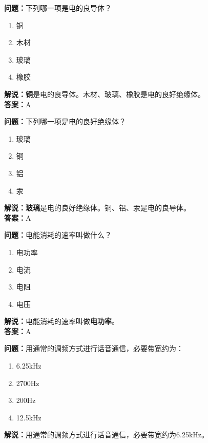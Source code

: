 \textbf{问题：}下列哪一项是电的良导体？

\begin{enumerate}[label=\Alph*), leftmargin=1cm]
	\item 铜
	\item 木材
	\item 玻璃
	\item 橡胶
\end{enumerate}

\textbf{解说：}\textbf{铜}是电的良导体。木材、玻璃、橡胶是电的良好绝缘体。\\\textbf{答案：}A



\textbf{问题：}下列哪一项是电的良好绝缘体？

\begin{enumerate}[label=\Alph*), leftmargin=1cm]
	\item 玻璃
	\item 铜
	\item 铝
	\item 汞
\end{enumerate}

\textbf{解说：}\textbf{玻璃}是电的良好绝缘体。铜、铝、汞是电的良导体。\\\textbf{答案：}A



\textbf{问题：}电能消耗的速率叫做什么？

\begin{enumerate}[label=\Alph*), leftmargin=1cm]
	\item 电功率
	\item 电流
	\item 电阻
	\item 电压
\end{enumerate}

\textbf{解说：}电能消耗的速率叫做\textbf{电功率}。\\\textbf{答案：}A



\textbf{问题：}用通常的调频方式进行话音通信，必要带宽约为：

\begin{enumerate}[label=\Alph*), leftmargin=1cm]
	\item 6.25kHz
	\item 2700Hz
	\item 200Hz
	\item 12.5kHz
\end{enumerate}

\textbf{解说：}用通常的调频方式进行话音通信，必要带宽约为6.25kHz。%

